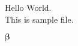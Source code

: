 \documentclass{article}
\begin{document}
 Hello World.\\
 This is sample file.

$\boldsymbol{\beta}$ 
\end{document}
